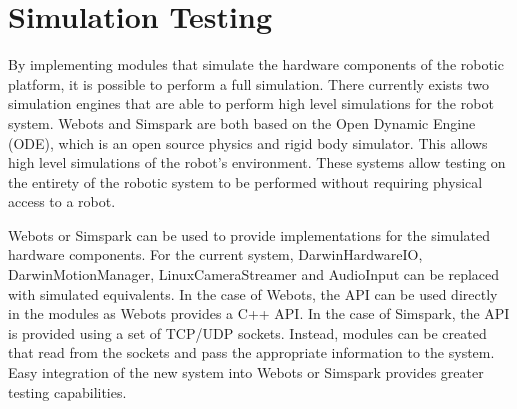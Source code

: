 \documentclass[english,12pt]{scrartcl}
\begin{document}
\section{Simulation Testing}
	By implementing modules that simulate the hardware components of the robotic platform, it is possible to perform a full simulation.
	There currently exists two simulation engines that are able to perform high level simulations for the robot system.
	Webots and Simspark are both based on the Open Dynamic Engine (ODE), which is an open source physics and rigid body simulator.
	This allows high level simulations of the robot’s environment. These systems allow testing on the entirety of the robotic system to be performed without requiring physical access to a robot.

	Webots or Simspark can be used to provide implementations for the simulated hardware components.
	For the current system, DarwinHardwareIO, DarwinMotionManager, LinuxCameraStreamer and AudioInput can be replaced with simulated equivalents.
	In the case of Webots, the API can be used directly in the modules as Webots provides a C++ API.
	In the case of Simspark, the API is provided using a set of TCP/UDP sockets.
	Instead, modules can be created that read from the sockets and pass the appropriate information to the system.
	Easy integration of the new system into Webots or Simspark provides greater testing capabilities.
\end{document}

